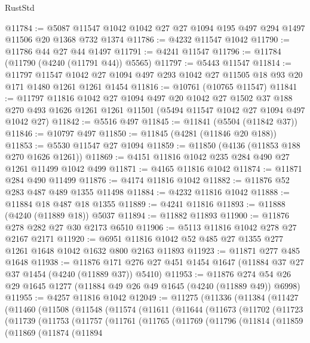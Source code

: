 \begin{lexlean}{RustStd}
\begin{coremodule}
{\begin{coremodule}
{{{{{{{{{{{{{{{{{{{{{{{{{{{{{{{{{{{@11784 := @5087 @11547 @1042 @1042 @27 @27 @1094 @195 @497 @294 @1497 @11506 @20 @1368 @732 @1374
@11786 := @4232 @11547 @1042
@11790 := @11786 @44 @27 @44 @1497
@11791 := @4241 @11547
@11796 := @11784 (@11790 (@4240 (@11791 @44)) @5565)
@11797 := @5443 @11547
@11814 := @11797
    @11547
    @1042
    @27
    @1094
    @497
    @293
    @1042
    @27
    @11505
    @18
    @93
    @20
    @171
    @1480
    @1261
    @1261
    @1454
@11816 := @10761 (@10765 @11547)
@11841 := @11797
    @11816
    @1042
    @27
    @1094
    @497
    @20
    @1042
    @27
    @1502
    @37
    @188
    @270
    @493
    @1626
    @1261
    @1261
    @11501
    (@5494 @11547 @1042 @27 @1094 @497 @1042 @27)
@11842 := @5516 @497
@11845 := @11841 (@5504 (@11842 @37))
@11846 := @10797 @497
@11850 := @11845 (@4281 (@11846 @20 @188))
@11853 := @5530 @11547 @27 @1094
@11859 := @11850 (@4136 (@11853 @188 @270 @1626 @1261))
@11869 := @4151 @11816 @1042 @235 @284 @490 @27 @1261 @11499 @1042 @499
@11871 := @4165 @11816 @1042
@11874 := @11871 @284 @490 @11499
@11876 := @4174 @11816 @1042
@11882 := @11876 @52 @283 @487 @489 @1355 @11498
@11884 := @4232 @11816 @1042
@11888 := @11884 @18 @487 @18 @1355
@11889 := @4241 @11816
@11893 := @11888 (@4240 (@11889 @18)) @5037
@11894 := @11882 @11893
@11900 := @11876 @278 @282 @27 @30 @2173 @6510
@11906 := @5113 @11816 @1042 @278 @27 @2167 @2171
@11920 := @6951 @11816 @1042 @52 @485 @27 @1355 @277 @1261 @1648 @1042 @1632 @800 @2163 @11893
@11923 := @11871 @277 @485 @1648
@11938 := @11876
    @171
    @276
    @27
    @451
    @1454
    @1647
    (@11884 @37 @27 @37 @1454 (@4240 (@11889 @37)) @5410)
@11953 := @11876 @274 @54 @26 @29 @1645 @1277 (@11884 @49 @26 @49 @1645 (@4240 (@11889 @49)) @6998)
@11955 := @4257 @11816 @1042
@12049 := @11275
    (@11336
      (@11384
        (@11427
          (@11460
            (@11508
              (@11548
                (@11574
                  (@11611
                    (@11644
                      (@11673
                        (@11702
                          (@11723
                            (@11739
                              (@11753
                                (@11757
                                  (@11761
                                    (@11765
                                      (@11769
                                        (@11796
                                          (@11814
                                            (@11859
                                              (@11869
                                                (@11874
                                                  (@11894
}}}}}}}}}}}}}}}}}}}}}}}}}}}}}}}}}}}
\end{coremodule}}
\end{coremodule}
\end{lexlean}
